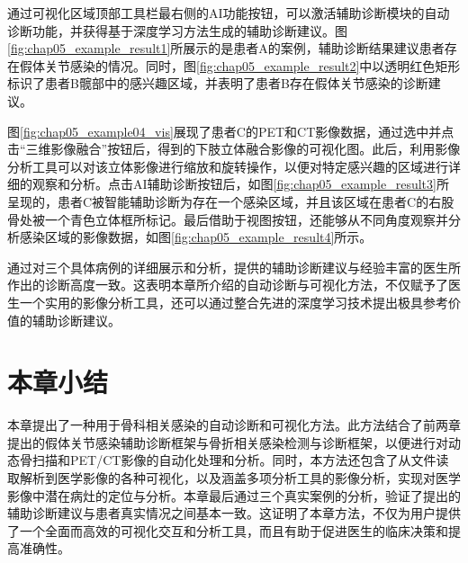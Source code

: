 通过可视化区域顶部工具栏最右侧的AI功能按钮，可以激活辅助诊断模块的自动诊断功能，并获得基于深度学习方法生成的辅助诊断建议。图\ref{fig:chap05_example_result1}所展示的是患者A的案例，辅助诊断结果建议患者存在假体关节感染的情况。同时，图\ref{fig:chap05_example_result2}中以透明红色矩形标识了患者B髋部中的感兴趣区域，并表明了患者B存在假体关节感染的诊断建议。

图\ref{fig:chap05_example04_vis}展现了患者C的PET和CT影像数据，通过选中并点击“三维影像融合”按钮后，得到的下肢立体融合影像的可视化图。此后，利用影像分析工具可以对该立体影像进行缩放和旋转操作，以便对特定感兴趣的区域进行详细的观察和分析。点击AI辅助诊断按钮后，如图\ref{fig:chap05_example_result3}所呈现的，患者C被智能辅助诊断为存在一个感染区域，并且该区域在患者C的右股骨处被一个青色立体框所标记。最后借助于视图按钮，还能够从不同角度观察并分析感染区域的影像数据，如图\ref{fig:chap05_example_result4}所示。

通过对三个具体病例的详细展示和分析，提供的辅助诊断建议与经验丰富的医生所作出的诊断高度一致。这表明本章所介绍的自动诊断与可视化方法，不仅赋予了医生一个实用的影像分析工具，还可以通过整合先进的深度学习技术提出极具参考价值的辅助诊断建议。

\section{本章小结}

本章提出了一种用于骨科相关感染的自动诊断和可视化方法。此方法结合了前两章提出的假体关节感染辅助诊断框架与骨折相关感染检测与诊断框架，以便进行对动态骨扫描和PET/CT影像的自动化处理和分析。同时，本方法还包含了从文件读取解析到医学影像的各种可视化，以及涵盖多项分析工具的影像分析，实现对医学影像中潜在病灶的定位与分析。本章最后通过三个真实案例的分析，验证了提出的辅助诊断建议与患者真实情况之间基本一致。这证明了本章方法，不仅为用户提供了一个全面而高效的可视化交互和分析工具，而且有助于促进医生的临床决策和提高准确性。